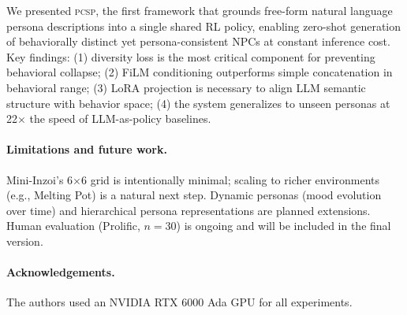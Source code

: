 \documentclass{article}
\newcommand{\PCSP}{\textsc{pcsp}}
\begin{document}
We presented \PCSP{}, the first framework that grounds free-form natural
language persona descriptions into a single shared RL policy, enabling
zero-shot generation of behaviorally distinct yet persona-consistent NPCs at
constant inference cost.
Key findings: (1) diversity loss is the most critical component for preventing
behavioral collapse; (2) FiLM conditioning outperforms simple concatenation in
behavioral range; (3) LoRA projection is necessary to align LLM semantic
structure with behavior space; (4) the system generalizes to unseen personas
at 22$\times$ the speed of LLM-as-policy baselines.

\paragraph{Limitations and future work.}
Mini-Inzoi's 6$\times$6 grid is intentionally minimal; scaling to richer
environments (e.g., Melting Pot) is a natural next step.
Dynamic personas (mood evolution over time) and hierarchical persona
representations are planned extensions.
Human evaluation (Prolific, $n\!=\!30$) is ongoing and will be included in the
final version.

\paragraph{Acknowledgements.}
The authors used an NVIDIA RTX 6000 Ada GPU for all experiments.



\end{document}
